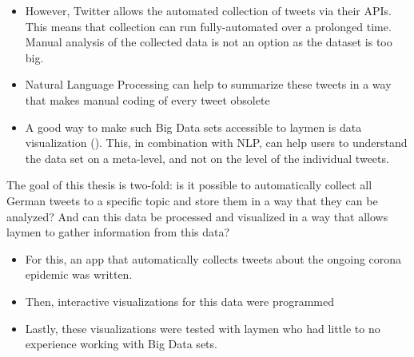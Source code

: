 \begin{itemize}
    \item However, Twitter allows the automated collection of tweets via their APIs. This means that collection can run fully-automated over a prolonged time. Manual analysis of the collected data is not an option as the dataset is too big.
    \item Natural Language Processing can help to summarize these tweets in a way that makes manual coding of every tweet obsolete
    \item A good way to make such Big Data sets accessible to laymen is data visualization (\cite{donalekImmersiveCollaborativeData2014}). This, in combination with NLP, can help users to understand the data set on a meta-level, and not on the level of the individual tweets.
\end{itemize}

The goal of this thesis is two-fold: is it possible to automatically collect all German tweets to a specific topic and store them in a way that they can be analyzed? And can this data be processed and visualized in a way that allows laymen to gather information from this data?

\begin{itemize}
    \item For this, an app that automatically collects tweets about the ongoing corona epidemic was written.
    \item Then, interactive visualizations for this data were programmed
    \item Lastly, these visualizations were tested with laymen who had little to no experience working with Big Data sets.
\end{itemize}